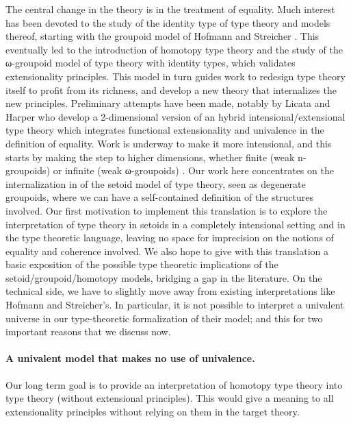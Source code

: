 The central change in the theory is in the treatment of equality.  Much
interest has been devoted to the study of the identity type of type
theory and models thereof, starting with the groupoid model of Hofmann
and Streicher \cite{groupoid-interp}. This eventually led to the
introduction of homotopy type theory and the study of the ω-groupoid
model of type theory with identity types, which validates extensionality
principles.
This model in turn
guides work to redesign type theory itself to profit from its
richness, and develop a new theory that internalizes the new
principles. Preliminary attempts have been made, notably by Licata and
Harper \cite{DBLP:conf/popl/LicataH12} who develop a 2-dimensional
version of an hybrid intensional/extensional type theory which
integrates functional extensionality and univalence in the definition
of equality. Work is underway to make it more intensional, and this
starts by making the step to higher dimensions, whether finite (weak
n-groupoids) or infinite (weak ω-groupoids)
\cite{DBLP:conf/csl/AltenkirchR12}. %
%
Our work here concentrates on the internalization in \Coq of the setoid
model of type theory, seen as degenerate groupoids, where we can have a
self-contained definition of the structures involved. 
%
Our first motivation to implement this translation is to explore the
interpretation of type theory in setoids in a completely intensional
setting and in the type theoretic language, leaving no space for
imprecision on the notions of equality and coherence involved.  We also
hope to give with this translation a basic exposition of the possible
type theoretic implications of the setoid/groupoid/homotopy models,
bridging a gap in the literature.
%
On the technical side, we have to slightly move away from existing
interpretations like Hofmann and Streicher's.  In particular, it is not
possible to interpret a univalent universe in our type-theoretic
formalization of their model; and this for two important reasons that we
discuss now.


\paragraph{\bf A univalent model that makes no use of univalence.}


Our long term goal is to provide an interpretation of homotopy type
theory into type theory (without extensional principles).
%
This would give a meaning to all extensionality
principles without relying on them in the target theory.

